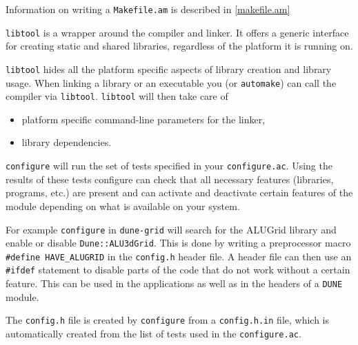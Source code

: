\documentclass[11pt,a4paper,headinclude,footinclude,DIV16,normalheadings]{scrartcl}
\newcommand{\dune}{\texttt{DUNE}\xspace}
\newcommand{\automake}{\texttt{automake}\xspace}
\newcommand{\libtool}{\texttt{libtool}\xspace}
\newcommand{\configure}{\texttt{configure}\xspace}
\newcommand{\configureac}{\texttt{configure.ac}\xspace}
\newcommand{\makefileam}{\texttt{Makefile.am}\xspace}
\newcommand{\dunegrid}{\texttt{dune-grid}\xspace}
\begin{document}
\begin{center}
\end{center}

Information on writing a \makefileam is described in \ref{makefile.am}

\libtool is a wrapper around the compiler and
linker. It offers a generic interface for creating static and shared
libraries, regardless of the platform it is running on.

\libtool hides all the platform specific aspects of library creation
and library usage. When linking a library or an executable you (or
\automake) can call the compiler via \libtool. \libtool will then take
care of
\begin{itemize}
\item platform specific command-line parameters for the linker,
\item library dependencies.
\end{itemize}

\label{configure}
\configure will run the set of tests specified in your \configureac.
Using the results of these tests configure can check that all
necessary features (libraries, programs, etc.) are present and can activate
and deactivate certain features of the module depending on what is
available on your system.

For example \configure in \dunegrid will search for the ALUGrid
library and  enable or disable \texttt{Dune::ALU3dGrid}.
This is done by writing a preprocessor macro \verb!#define HAVE_ALUGRID!
in the \texttt{config.h}
header file. A header file can then use an \verb!#ifdef! statement to
disable parts of the code that do not work without a certain
feature. This can be used in the applications as well as in the headers
of a \dune module.

The \texttt{config.h} file is created by \configure from a
\texttt{config.h.in} file, which is automatically created from the
list of tests used in the \configureac.
\end{document}
